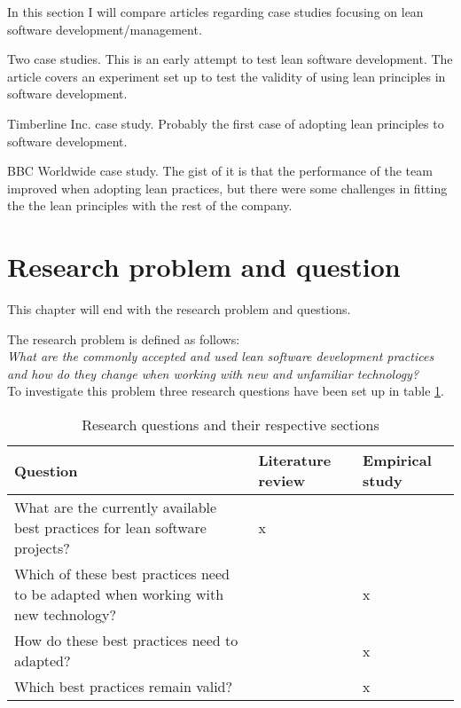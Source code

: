 In this section I will compare articles regarding case studies focusing on lean software development/management.

Two case studies. This is an early attempt to test lean software development. The article covers an experiment set up to test the validity of using lean principles in software development. \cite{Middleton2001Lean}

Timberline Inc. case study. Probably the first case of adopting lean principles to software development.\cite{Middleton2005Lean}

BBC Worldwide case study. The gist of it is that the performance of the team improved when adopting lean practices, but there were some challenges in fitting the the lean principles with the rest of the company.\cite{Middleton2012Lean}


\section{Research problem and question}
\label{section:problem}

This chapter will end with the research problem and questions.

The research problem is defined as follows:\\

\textit{What are the commonly accepted and used lean software development practices and how do they change when working with new and unfamiliar technology?}\\

To investigate this problem three research questions have been set up in table \ref{tbl:questions}.


\begin{table}
  \begin{tabular}{p{200pt} | p{70pt} | p{70pt}}
    Question & Literature review & Empirical study \\
    \hline
    What are the currently available best practices for lean software projects? & x & \\
    Which of these best practices need to be adapted when working with new technology? &  & x \\
    How do these best practices need to adapted? &  & x \\
    Which best practices remain valid? &  & x \\
  \end{tabular}
  \caption{Research questions and their respective sections}
  \label{tbl:questions}
\end{table}